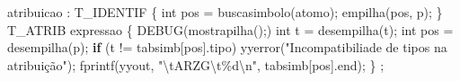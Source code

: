 \documentclass[
  brazilian,
  letterpaper,
]{book}
\newenvironment{Shaded}{\begin{snugshade}}{\end{snugshade}}
\newcommand{\CharTok}[1]{\textcolor[rgb]{0.13,0.47,0.30}{#1}}
\newcommand{\ControlFlowTok}[1]{\textcolor[rgb]{0.00,0.23,0.31}{\textbf{#1}}}
\newcommand{\DataTypeTok}[1]{\textcolor[rgb]{0.68,0.00,0.00}{#1}}
\newcommand{\NormalTok}[1]{\textcolor[rgb]{0.00,0.23,0.31}{#1}}
\newcommand{\OperatorTok}[1]{\textcolor[rgb]{0.37,0.37,0.37}{#1}}
\newcommand{\SpecialCharTok}[1]{\textcolor[rgb]{0.37,0.37,0.37}{#1}}
\newcommand{\StringTok}[1]{\textcolor[rgb]{0.13,0.47,0.30}{#1}}
\theoremstyle{plain}
\theoremstyle{definition}
\theoremstyle{remark}
\begin{document}
\begin{Shaded}
\begin{Highlighting}[]
\NormalTok{atribuicao}
    \OperatorTok{:}\NormalTok{ T\_IDENTIF}
        \OperatorTok{\{} 
            \DataTypeTok{int}\NormalTok{ pos }\OperatorTok{=}\NormalTok{ buscasimbolo}\OperatorTok{(}\NormalTok{atomo}\OperatorTok{);}
\NormalTok{            empilha}\OperatorTok{(}\NormalTok{pos}\OperatorTok{,} \CharTok{\textquotesingle{}p\textquotesingle{}}\OperatorTok{);}
        \OperatorTok{\}} 
\NormalTok{      T\_ATRIB expressao}
        \OperatorTok{\{}
\NormalTok{            DEBUG}\OperatorTok{(}\NormalTok{mostrapilha}\OperatorTok{();)}
            \DataTypeTok{int}\NormalTok{ t }\OperatorTok{=}\NormalTok{ desempilha}\OperatorTok{(}\CharTok{\textquotesingle{}t\textquotesingle{}}\OperatorTok{);}
            \DataTypeTok{int}\NormalTok{ pos }\OperatorTok{=}\NormalTok{ desempilha}\OperatorTok{(}\CharTok{\textquotesingle{}p\textquotesingle{}}\OperatorTok{);} 
            \ControlFlowTok{if} \OperatorTok{(}\NormalTok{t }\OperatorTok{!=}\NormalTok{ tabsimb}\OperatorTok{[}\NormalTok{pos}\OperatorTok{].}\NormalTok{tipo}\OperatorTok{)} 
\NormalTok{                yyerror}\OperatorTok{(}\StringTok{"Incompatibiliade de tipos na atribuição"}\OperatorTok{);}
\NormalTok{            fprintf}\OperatorTok{(}\NormalTok{yyout}\OperatorTok{,} \StringTok{"}\SpecialCharTok{\textbackslash{}t}\StringTok{ARZG}\SpecialCharTok{\textbackslash{}t\%d\textbackslash{}n}\StringTok{"}\OperatorTok{,}\NormalTok{ tabsimb}\OperatorTok{[}\NormalTok{pos}\OperatorTok{].}\NormalTok{end}\OperatorTok{);} 
        \OperatorTok{\}}
    \OperatorTok{;}


\end{Highlighting}
\end{Shaded}
\end{document}
